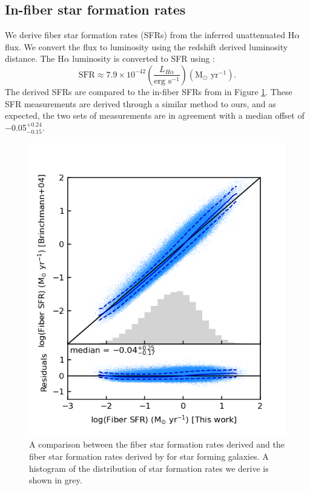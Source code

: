 \documentclass[fleqn,usenatbib]{mnras}
\begin{document}
\subsection{In-fiber star formation rates}
We derive fiber star formation rates (SFRs) from the inferred unattenuated H$\alpha$ flux. We convert the flux to luminosity using the redshift derived luminosity distance. The H$\alpha$ luminosity is converted to SFR using \cite{kennicutt1998}:
\begin{equation}
    \textrm{SFR} \approx 7.9 \times 10^{-42} \left( \frac{L_{H\alpha}}{\textrm{erg s}^{-1}} \right) (\textrm{M}_{\odot} \textrm{ yr}^{-1}) .
\end{equation}
The derived SFRs are compared to the in-fiber SFRs from \cite{brinchmann2004} in Figure \ref{fig:model_SFR_vs_brinchmann04}. These SFR measurements are derived through a similar method to ours, and as expected, the two sets of measurements are in agreement with a median offset of $-$0.05$_{-0.15}^{+0.24}$. 

\begin{figure}
    \centering
    \includegraphics[width=\columnwidth]{figures/fig3.png}
    \caption{A comparison between the fiber star formation rates derived and the fiber star formation rates derived by \protect \cite{brinchmann2004} for star forming galaxies. A histogram of the distribution of star formation rates we derive is shown in grey.}
    \label{fig:model_SFR_vs_brinchmann04}
\end{figure}
\end{document}
